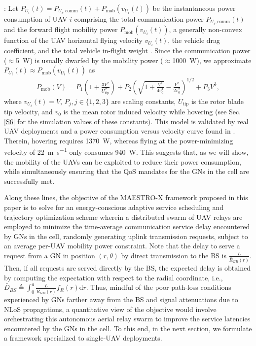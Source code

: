 \documentclass[12pt, draftcls, onecolumn]{IEEEtran}
\theoremstyle{plain}
\theoremstyle{definition}
\theoremstyle{remark}
\begin{document}
: Let $P_{U_{i}}(t){=}P_{U_{i}, \mathrm{comm}}(t){+}P_{\mathrm{mob}}(v_{U_{i}}(t))$ be the instantaneous power consumption of UAV $i$ comprising the total communication power $P_{U_{i}, \mathrm{comm}}(t)$ and the forward flight mobility power $P_{\mathrm{mob}}(v_{U_{i}}(t))$, a generally non-convex function of the UAV horizontal flying velocity $v_{U_{i}}(t)$, the vehicle drag coefficient, and the total vehicle in-flight weight \cite{EnduranceEstimation}. Since the communication power ($\approx$\qty[mode=text]{5}{\watt}) is usually dwarfed by the mobility power ($\approx$\qty[mode=text]{1000}{\watt}), we approximate $P_{U_{i}}(t){\approx}P_{\mathrm{mob}}(v_{U_{i}}(t))$ as \cite{SCA}
\begin{align}\label{eq:Power}
    P_{\mathrm{mob}}(V)=P_{1}\left(1+\frac{3V^{2}}{U_{\mathrm{tip}}^{2}}\right)+P_{2}\left(\sqrt{1+\frac{V^{4}}{4v_{0}^{4}}}-\frac{V^{2}}{2v_{0}^{2}}\right)^{1/2}+P_{3}V^{3},
\end{align}
where $v_{U_{i}}(t){=}V$, $P_{j},j{\in}\{1,2,3\}$ are scaling constants, $U_{\mathrm{tip}}$ is the rotor blade tip velocity, and $v_{0}$ is the mean rotor induced velocity while hovering (see Sec. \ref{S6} for the simulation values of these constants). This model is validated by real UAV deployments \cite{EnduranceEstimation} and a power consumption versus velocity curve found in \cite{SCA}. Therein, hovering requires \qty[mode=text]{1370}{\watt}, whereas flying at the power-minimizing velocity of \qty[mode=text]{22}{\meter\per\second} only consumes \qty[mode=text]{940}{\watt}. This suggests that, as we will show, the mobility of the UAVs can be exploited to reduce their power consumption, while simultaneously ensuring that the QoS mandates for the GNs in the cell are successfully met.

Along these lines, the objective of the MAESTRO-X framework proposed in this paper is to solve for an energy-conscious adaptive service scheduling and trajectory optimization scheme wherein a distributed swarm of UAV relays are employed to minimize the time-average communication service delay encountered by GNs in the cell, randomly generating uplink transmission requests, subject to an average per-UAV mobility power constraint. Note that the delay to serve a request from a GN in position $(r,\theta)$ by direct transmission to the BS is $\frac{L}{\bar{R}_{GB}(r)}$. Then, if all requests are served directly by the BS, the expected delay is obtained by computing the expectation with respect to the radial coordinate, i.e., $\bar{D}_{BS}{\triangleq}\int_{0}^{a}\frac{L}{\bar{R}_{GB}(r)}f_{R}(r)\mathrm{d}r$. Thus, mindful of the poor path-loss conditions experienced by GNs farther away from the BS and signal attenuations due to NLoS propagations, a quantitative view of the objective would involve orchestrating this autonomous aerial relay swarm to improve the service latencies encountered by the GNs in the cell. To this end, in the next section, we formulate a framework specialized to single-UAV deployments.
\vspace{-4mm}
\end{document}
